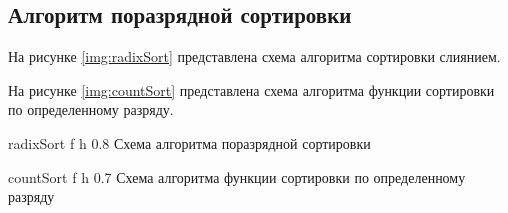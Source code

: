 \clearpage

\subsection{Алгоритм поразрядной сортировки}

На рисунке \ref{img:radixSort} представлена схема алгоритма сортировки слиянием.

На рисунке \ref{img:countSort} представлена схема алгоритма функции сортировки по определенному разряду.

{radixSort} %
{f} %
{h} %
{0.8\textwidth} %
{Схема алгоритма поразрядной сортировки} %

{countSort} %
{f} %
{h} %
{0.7\textwidth} %
{Схема алгоритма функции сортировки по определенному разряду} %

